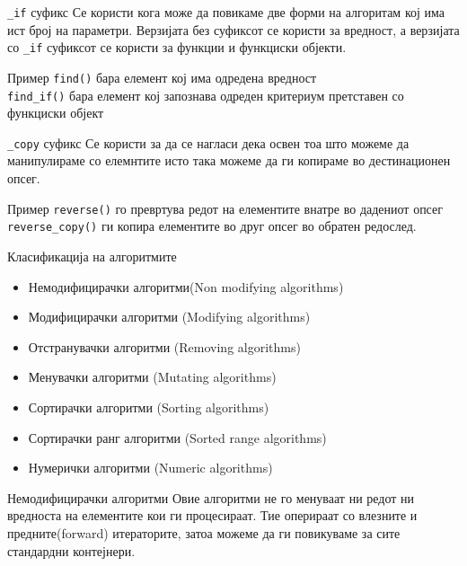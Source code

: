 \begin{frame}{\texttt{\_if} суфикс}
 Се користи кога може да повикаме две форми на алгоритам
кој има ист број на параметри. Верзијата без суфиксот се користи за вредност, а
верзијата со \texttt{\_if} суфиксот се користи за функции и функциски објекти.
\begin{block}{Пример}
\texttt{find()} бара елемент кој има одредена вредност\\
\texttt{find\_if()} бара елемент кој запознава одреден критериум претставен со
функциски објект
\end{block}
\end{frame}

\begin{frame}{\texttt{\_copy} суфикс}
 Се користи за да се нагласи дека освен тоа што можеме да манипулираме со
 елемнтите исто така можеме да ги копираме во дестинационен опсег.
\begin{block}{Пример}
\texttt{reverse()} го превртува редот на елементите внатре во дадениот опсег\\
\texttt{reverse\_copy()} ги копира елементите во друг опсег во обратен редослед.
\end{block}
\end{frame}

\begin{frame}{Класификација на алгоритмите}
\begin{itemize}
  \item Немодифицирачки алгоритми(Non modifying algorithms)
  \item Модифицирачки алгоритми (Modifying algorithms)
  \item Отстранувачки алгоритми (Removing algorithms)
  \item Менувачки алгоритми (Mutating algorithms) 
  \item Сортирачки алгоритми (Sorting algorithms) 
  \item Сортирачки ранг алгоритми (Sorted range algorithms)
  \item Нумерички алгоритми (Numeric algorithms)
\end{itemize}
\end{frame}

\begin{frame}{Немодифицирачки алгоритми}
Овие алгоритми не го менуваат ни редот ни вредноста на елементите кои ги
процесираат. Тие оперираат со влезните и предните(forward) итераторите, затоа
можеме да ги повикуваме за сите стандардни контејнери.
\end{frame}

